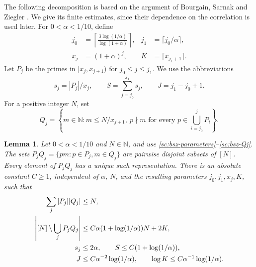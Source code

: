 \documentclass[twoside]{aomart}
\theoremstyle{paperplain}
\newtheorem{lemma}[theorem]{Lemma}
\theoremstyle{paperdefinition}
\newcommand{\N}{\mathbb N}
\numberwithin{equation}{section}
\begin{document}
The following decomposition is based on the argument of
Bourgain, Sarnak and Ziegler \cite[Section~2]{BSZ}. We give its
finite estimates, since their dependence on the correlation is used
later. For $0<\alpha<1/10$, define
\begin{equation}
 \begin{aligned}
 j_0&=\left\lceil\frac{3\log(1/\alpha)}{\log(1+\alpha)}\right\rceil,
 &j_1&=\lceil j_0/\alpha\rceil,\\
 x_j&=(1+\alpha)^j,
 &K&=\lceil x_{j_1+1}\rceil.
 \end{aligned}
 \label{sc:bsz-parameters}
\end{equation}
Let $P_j$ be the primes in $[x_j,x_{j+1})$ for
$j_0\le j\le j_1$.
We use the abbreviations
\begin{equation}
 s_j=|P_j|/x_j,\qquad S=\sum_{j=j_0}^{j_1}s_j,
 \qquad J=j_1-j_0+1.
 \label{sc:bsz-block-data}
\end{equation}
For a positive integer $N$, set
\begin{equation}
 Q_j=\left\{m\in\N:m\le N/x_{j+1},\ p\nmid m
             \text{ for every }p\in\bigcup_{i=j_0}^jP_i\right\}.
 \label{sc:bsz-Qj}
\end{equation}

\begin{lemma}\label{sc:decomposition}
Let $0<\alpha<1/10$ and $N\in\N$, and use
\eqref{sc:bsz-parameters}--\eqref{sc:bsz-Qj}.
The sets $P_jQ_j=\{pm:p\in P_j,m\in Q_j\}$ are pairwise disjoint
subsets of $[N]$. Every element of $P_jQ_j$ has a unique such
representation. There is an absolute constant $C\ge1$, independent
of $\alpha$, $N$, and the resulting parameters $j_0,j_1,x_j,K$, such that
\begin{align}
 \sum_j|P_j||Q_j|&\le N,\label{sc:bsz-disjoint-mass}\\
 \left|[N]\setminus\bigcup_jP_jQ_j\right|
 &\le C\alpha(1+\log(1/\alpha))N+2K,
 \label{sc:bsz-coverage}\\
 s_j&\le2\alpha,\qquad S\le C(1+\log(1/\alpha)), \notag
\\
 J&\le C\alpha^{-2}\log(1/\alpha),\qquad
 \log K\le C\alpha^{-1}\log(1/\alpha).
 \label{sc:bsz-cutoff-bound}
\end{align}
\end{lemma}
\end{document}
